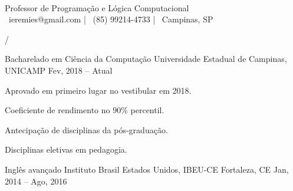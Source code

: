 \documentclass[]{awesome-cv}
\begin{document}
    
\begin{center}
	  \\
	\vspace{2mm}
	{Professor de Programação e Lógica Computacional} \\
	\vspace{2mm}
	{\faEnvelope\ ieremies@gmail.com} | {\faMobile\ (85) 99214-4733} | {\faMapMarker\ Campinas, SP}
\end{center}
/
\begin{cventries}
	\cventry
	{Bacharelado em Ciência da Computação}
	{Universidade Estadual de Campinas, UNICAMP}
	{}
	{Fev, 2018 – Atual}
	{\begin{cvitems}
		\item {Aprovado em primeiro lugar no vestibular em 2018.}
		\item {Coeficiente de rendimento no $90\%$ percentil.}
		\item {Antecipação de disciplinas da pós-graduação.}
		\item {Disciplinas eletivas em pedagogia.}
	  \end{cvitems}}
	\cventry
	{Inglês avançado}
	{Instituto Brasil Estados Unidos, IBEU-CE}
	{Fortaleza, CE}
	{Jan, 2014 – Ago, 2016}
	{}
\end{cventries}
\end{document}
